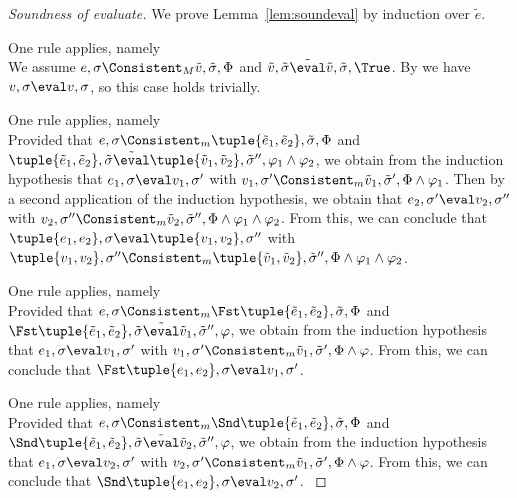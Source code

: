 \begin{proof}[Soundness of evaluate]

  We prove Lemma~\ref{lem:soundeval} by induction over $\tilde{e}$.

    {One rule applies, namely \\
    We assume $e,\sigma\Consistent_M\tilde{v},\tilde{\sigma},\Phi$ and $\tilde{v},\tilde{\sigma}\tilde{\eval}\tilde{v},\tilde{\sigma},\True$.
    By  we have $v,\sigma\eval v,\sigma$, so this case holds trivially.
    }

    {One rule applies, namely \\
    Provided that $e,\sigma\Consistent_m\tuple{\tilde{e}_1,\tilde{e}_2},\tilde{\sigma},\Phi$ and $\tuple{\tilde{e}_1,\tilde{e}_2},\tilde{\sigma}\tilde{\eval}\tuple{\tilde{v}_1,\tilde{v}_2},\tilde{\sigma}'',\phi_1\land\phi_2$,
    we obtain from the induction hypothesis that $e_1,\sigma\eval v_1,\sigma'$ with $v_1,\sigma'\Consistent_m\tilde{v}_1,\tilde{\sigma}',\Phi\land\phi_1$.
    Then by a second application of the induction hypothesis, we obtain that $e_2,\sigma'\eval v_2,\sigma''$ with $v_2,\sigma''\Consistent_m\tilde{v}_2,\tilde{\sigma}'',\Phi\land\phi_1\land\phi_2$.
    From this, we can conclude that $\tuple{e_1,e_2},\sigma\eval\tuple{v_1,v_2},\sigma''$ with $\tuple{v_1,v_2},\sigma''\Consistent_m\tuple{\tilde{v}_1,\tilde{v}_2},\tilde{\sigma}'',\Phi\land\phi_1\land\phi_2$.
    }

  {
    One rule applies, namely \\
    Provided that $e,\sigma\Consistent_m\Fst\tuple{\tilde{e}_1,\tilde{e}_2},\tilde{\sigma},\Phi$ and $\Fst\tuple{\tilde{e}_1,\tilde{e}_2},\tilde{\sigma}\tilde{\eval}\tilde{v}_1,\tilde{\sigma}'',\phi$,
    we obtain from the induction hypothesis that $e_1,\sigma\eval v_1,\sigma'$ with $v_1,\sigma'\Consistent_m\tilde{v}_1,\tilde{\sigma}',\Phi\land\phi$.
    From this, we can conclude that $\Fst\tuple{e_1,e_2},\sigma\eval v_1,\sigma'$.
    }

  { One rule applies, namely \\
  Provided that $e,\sigma\Consistent_m\Snd\tuple{\tilde{e}_1,\tilde{e}_2},\tilde{\sigma},\Phi$ and $\Snd\tuple{\tilde{e}_1,\tilde{e}_2},\tilde{\sigma}\tilde{\eval}\tilde{v}_2,\tilde{\sigma}'',\phi$,
  we obtain from the induction hypothesis that $e_1,\sigma\eval v_2,\sigma'$ with $v_2,\sigma'\Consistent_m\tilde{v}_1,\tilde{\sigma}',\Phi\land\phi$.
  From this, we can conclude that $\Snd\tuple{e_1,e_2},\sigma\eval v_2,\sigma'$.
    }


\end{proof}
